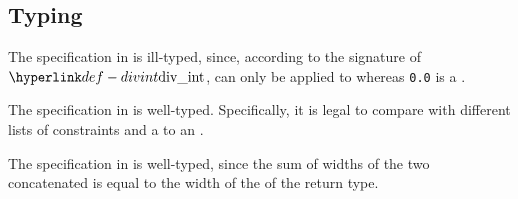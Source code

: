 \FormallyParagraph
\begin{mathpar}
\end{mathpar}

\begin{mathpar}
\end{mathpar}

\begin{mathpar}
\end{mathpar}

\subsection{Typing}
The specification in  is ill-typed, since,
according to the signature of $\divint$, \Tdiv{} can only be applied to \integertypesterm{}
whereas \verb|0.0| is a \realtypeterm.

The specification in  is well-typed.
Specifically, it is legal to compare \wellconstrainedintegertypes{}
with different lists of constraints and a \wellconstrainedintegertype{} to an \unconstrainedintegertype{}.

The specification in  is well-typed, since
the sum of widths of the two concatenated \bitvectortypesterm{}
is equal to the width of the \bitvectortypeterm{} of the return type.

